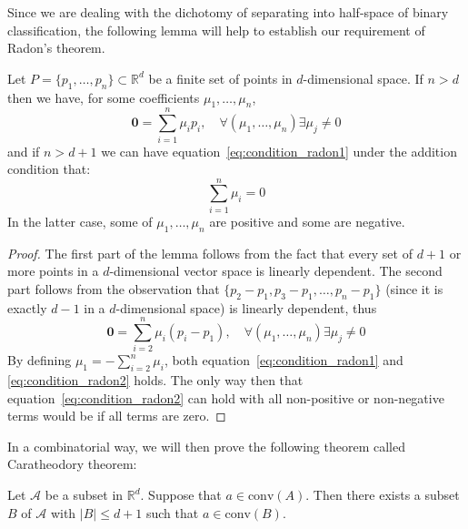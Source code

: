 Since we are dealing with the dichotomy of separating into half-space of binary classification, the following lemma will help to establish our requirement of Radon's theorem. 
\begin{lemma}\label{lem:lemma_cathedory_radon}
    Let $P=\{p_{1},\dots,p_{n}\}\subset \mathbb{R}^{d}$ be a finite set of points in $d$-dimensional space. If $n>d$ then we have, for some coefficients $\mu_{1},\dots,\mu_{n}$, 
    \begin{equation}
        \mathbf{0} = \sum^{n}_{i=1} \mu_{i}p_{i}, \quad \forall(\mu_{1},\dots,\mu_{n}) \exists \mu_{j} \neq 0 \label{eq:condition_radon1}
    \end{equation}
    and if $n>d+1$ we can have equation~\ref{eq:condition_radon1} under the addition condition that: 
    \begin{equation}
        \sum^{n}_{i=1} \mu_{i} = 0
        \label{eq:condition_radon2}
    \end{equation}
    In the latter case, some of $\mu_{1},\dots,\mu_{n}$ are positive and some are negative. 
\end{lemma}
\begin{proof}
    The first part of the lemma follows from the fact that every set of $d+1$ or more points in a $d$-dimensional vector space is linearly dependent. The second part follows from the observation that $\{p_{2}-p_{1},p_{3}-p_{1},\dots,p_{n}-p_{1}\}$ (since it is exactly $d-1$ in a $d$-dimensional space) is linearly dependent, thus 
    \begin{equation}
        \mathbf{0} = \sum^{n}_{i=2} \mu_{i}(p_{i}-p_{1}), \quad \forall(\mu_{1},\dots,\mu_{n}) \exists \mu_{j} \neq 0
    \end{equation}
    By defining $\mu_{1}=-\sum^{n}_{i=2}\mu_{i}$, both equation~\ref{eq:condition_radon1} and \ref{eq:condition_radon2} holds. The only way then that equation~\ref{eq:condition_radon2} can hold with all non-positive or non-negative terms would be if all terms are zero. 
\end{proof}

In a combinatorial way, we will then prove the following theorem called Caratheodory theorem:
\begin{theorem}[Caratheodory]
    Let $\mathcal{A}$ be a subset in $\mathbb{R}^{d}$. Suppose that $a\in \mathrm{conv}(A)$. Then there exists a subset $B$ of $\mathcal{A}$ with $\lvert B \rvert \leq d+1$ such that $a\in \mathrm{conv}(B)$.
\end{theorem}

